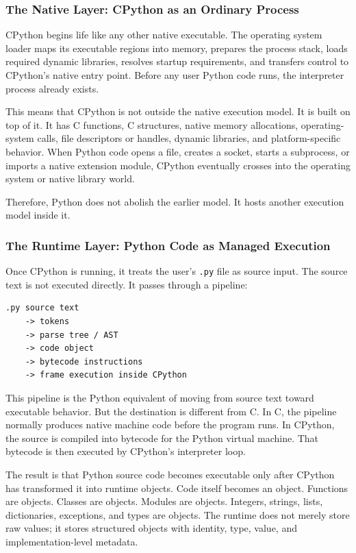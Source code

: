 \subsubsection{The Native Layer: CPython as an Ordinary Process}

CPython begins life like any other native executable. The operating system loader maps its executable regions into memory, prepares the process stack, loads required dynamic libraries, resolves startup requirements, and transfers control to CPython's native entry point. Before any user Python code runs, the interpreter process already exists.

This means that CPython is not outside the native execution model. It is built on top of it. It has C functions, C structures, native memory allocations, operating-system calls, file descriptors or handles, dynamic libraries, and platform-specific behavior. When Python code opens a file, creates a socket, starts a subprocess, or imports a native extension module, CPython eventually crosses into the operating system or native library world.

Therefore, Python does not abolish the earlier model. It hosts another execution model inside it.

\subsubsection{The Runtime Layer: Python Code as Managed Execution}

Once CPython is running, it treats the user's \texttt{.py} file as source input. The source text is not executed directly. It passes through a pipeline:

\begin{verbatim}
.py source text
    -> tokens
    -> parse tree / AST
    -> code object
    -> bytecode instructions
    -> frame execution inside CPython
\end{verbatim}

This pipeline is the Python equivalent of moving from source text toward executable behavior. But the destination is different from C. In C, the pipeline normally produces native machine code before the program runs. In CPython, the source is compiled into bytecode for the Python virtual machine. That bytecode is then executed by CPython's interpreter loop.

The result is that Python source code becomes executable only after CPython has transformed it into runtime objects. Code itself becomes an object. Functions are objects. Classes are objects. Modules are objects. Integers, strings, lists, dictionaries, exceptions, and types are objects. The runtime does not merely store raw values; it stores structured objects with identity, type, value, and implementation-level metadata.

